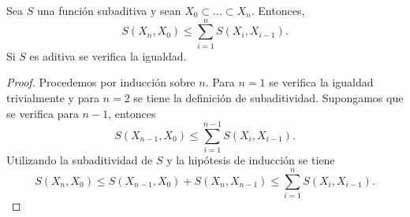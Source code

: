 \bigskip

\begin{lemma}
\label{lema__weak_desig_morse}
    Sea $S$ una función subaditiva y sean $X_0\subset \dots \subset X_n$. Entonces,
    \begin{equation*}
        S(X_n, X_0) \le \sum^n_{i=1} S(X_i,X_{i-1}).
    \end{equation*}
    Si $S$ es aditiva se verifica la igualdad.
\end{lemma}
\begin{proof}
    Procedemos por inducción sobre $n$. Para $n=1$ se verifica la igualdad trivialmente y para $n=2$ se tiene la definición de subaditividad. Supongamos que se verifica para $n-1$, entonces
    \begin{equation*}
        S(X_{n-1}, X_0) \le \sum^{n-1}_{i=1} S(X_i,X_{i-1}).
    \end{equation*}
    Utilizando la subaditividad de $S$ y la hipótesis de inducción se tiene
    \begin{equation*}
        S(X_n, X_0) \le S(X_{n-1}, X_0) + S(X_n, X_{n-1}) \le \sum^n_{i=1} S(X_i,X_{i-1}). 
    \end{equation*}

\end{proof}

\bigskip

